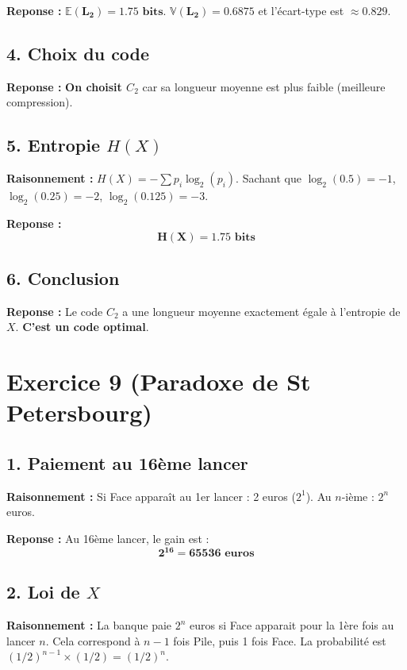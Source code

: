 \documentclass[11pt,a4paper]{article}
\begin{document}
\textbf{Reponse :} $\mathbf{\mathbb{E}(L_2) = 1.75 \text{ bits}}$. $\mathbf{\mathbb{V}(L_2) = 0.6875}$ et l'écart-type est $\mathbf{\approx 0.829}$.

\subsection*{4. Choix du code}

\textbf{Reponse :} \textbf{On choisit $C_2$} car sa longueur moyenne est plus faible (meilleure compression).

\subsection*{5. Entropie $H(X)$}

\textbf{Raisonnement :} $H(X) = - \sum p_i \log_2(p_i)$. Sachant que $\log_2(0.5) = -1$, $\log_2(0.25) = -2$, $\log_2(0.125) = -3$.

\textbf{Reponse :} 
$$
\mathbf{H(X) = 1.75 \text{ bits}}
$$

\subsection*{6. Conclusion}

\textbf{Reponse :} Le code $C_2$ a une longueur moyenne exactement égale à l'entropie de $X$. \textbf{C'est un code optimal}.

\hrulefill

\section*{Exercice 9 (Paradoxe de St Petersbourg)}

\subsection*{1. Paiement au 16ème lancer}

\textbf{Raisonnement :} Si Face apparaît au 1er lancer : 2 euros ($2^1$). Au $n$-ième : $2^n$ euros.

\textbf{Reponse :} Au 16ème lancer, le gain est :
$$
\mathbf{2^{16} = 65536 \text{ euros}}
$$

\subsection*{2. Loi de $X$}

\textbf{Raisonnement :} La banque paie $2^n$ euros si Face apparait pour la 1ère fois au lancer $n$. Cela correspond à $n-1$ fois Pile, puis 1 fois Face. La probabilité est $(1/2)^{n-1} \times (1/2) = (1/2)^n$.
\end{document}

